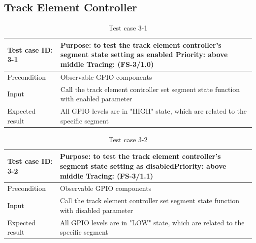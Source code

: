\subsection{Track Element Controller}

\begin{table}[H]
	\caption{Test case 3-1}
	\label{table:TCase-FS3-1}
	\begin{center}
		\renewcommand{\arraystretch}{1.8}
		\begin{tabu} 
			to 0.9 \textwidth
			{  X[0.3, l] X[l] }
			\toprule
			Test case ID: 3-1 & Purpose: to test the track element controller's segment state setting as enabled \newline Priority: above middle \newline Tracing: (FS-3/1.0) \\ \midrule
			Precondition      & Observable GPIO components                                                                                                                    \\
			Input             & Call the track element controller set segment state function with enabled parameter                                                           \\
			Expected result   & All GPIO levels are in "HIGH" state, which are related to the specific segment                                                                \\ \bottomrule
		\end{tabu}
	\end{center}
\end{table}

\begin{table}[H]
	\caption{Test case 3-2}
	\label{table:TCase-FS3-2}
	\begin{center}
		\renewcommand{\arraystretch}{1.8}
		\begin{tabu} 
			to 0.9 \textwidth
			{  X[0.3, l] X[l] }
			\toprule
			Test case ID: 3-2 & Purpose: to test the track element controller's segment state setting as disabled\newline Priority: above middle \newline Tracing: (FS-3/1.1) \\ \midrule
			Precondition      & Observable GPIO components                                                                                                                    \\
			Input             & Call the track element controller set segment state function with disabled parameter                                                          \\
			Expected result   & All GPIO levels are in "LOW" state, which are related to the specific segment                                                                 \\ \bottomrule
		\end{tabu}
	\end{center}
\end{table} 

